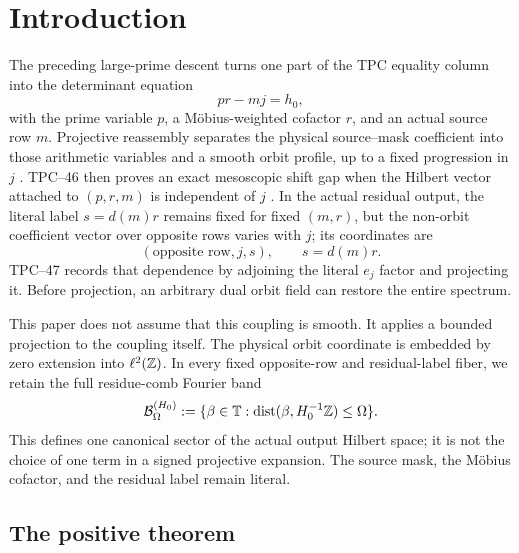 \section{Introduction}
\label{sec:tpc47-introduction}

The preceding large-prime descent turns one part of the TPC equality
column into the determinant equation
\begin{equation}
 pr-mj=h_0,
 \label{eq:tpc47-opening-determinant}
\end{equation}
with the prime variable \(p\), a M\"obius-weighted cofactor \(r\), and
an actual source row \(m\).  Projective reassembly separates the
physical source--mask coefficient into those arithmetic variables and
a smooth orbit profile, up to a fixed progression in \(j\)
\citep{WangTPC36,WangTPC45}.  TPC--46 then proves an exact
mesoscopic shift gap when the Hilbert vector attached to
\((p,r,m)\) is independent of \(j\) \citep{WangTPC46}.  In the actual
residual output, the literal label \(s=d(m)r\) remains fixed for
fixed \((m,r)\), but the non-orbit coefficient vector over opposite
rows varies with \(j\); its coordinates are
\begin{equation}
 (\text{opposite row},j,s),\qquad s=d(m)r.
 \label{eq:tpc47-actual-output-coordinate}
\end{equation}
TPC--47 records that dependence by adjoining the literal \(e_j\)
factor and projecting it.  Before projection, an arbitrary dual orbit
field can restore the entire spectrum.

This paper does not assume that this coupling is smooth.  It applies a
bounded projection to the coupling itself.  The physical orbit
coordinate is embedded by zero extension into \(\ell^2(\mathbb Z)\).  In every
fixed opposite-row and residual-label fiber, we retain the full
residue-comb Fourier band
\begin{equation}
 \mathcal B_\Omega^{(H_0)}
 :=\{\beta\in\mathbb T:
 \operatorname{dist}(\beta,H_0^{-1}\mathbb Z)\le\Omega\}.
 \label{eq:tpc47-low-orbit-band}
\end{equation}
This defines one canonical sector of the actual output Hilbert space;
it is not the choice of one term in a signed projective expansion.  The
source mask, the M\"obius cofactor, and the residual label remain
literal.

\subsection{The positive theorem}

